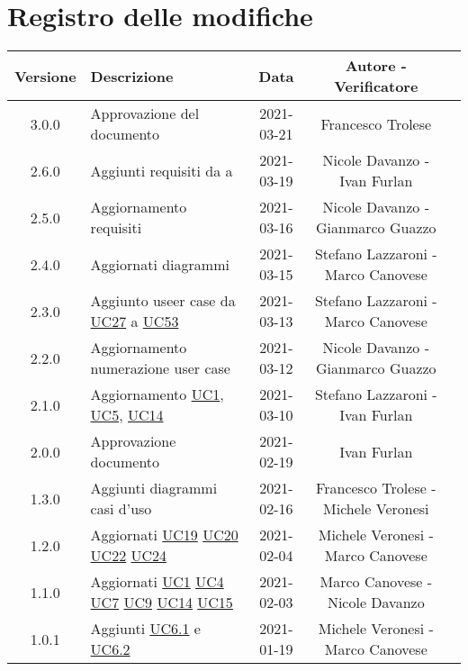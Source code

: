 \section*{Registro delle modifiche}

\begin{center}
	\begin{longtable}{|c|p{5cm}|c|c|c|}
	\hline
	\rowcolor{lighter-grayer}
	\textbf{Versione} & \textbf{Descrizione} & \textbf{Data} & \textbf{Autore - Verificatore} \\
	\hline
	\endfirsthead


	\hline
	3.0.0 & Approvazione del documento & 2021-03-21 & Francesco Trolese \\
	2.6.0 & Aggiunti requisiti da {F}{29} a {F}{43} & 2021-03-19 & Nicole Davanzo - Ivan Furlan\\
	2.5.0 & Aggiornamento requisiti & 2021-03-16 & Nicole Davanzo - Gianmarco Guazzo\\
	2.4.0 & Aggiornati diagrammi & 2021-03-15 & Stefano Lazzaroni - Marco Canovese\\
	2.3.0 & Aggiunto useer case da \hyperref[UC27]{UC27} a \hyperref[UC53]{UC53} & 2021-03-13 &  Stefano Lazzaroni - Marco Canovese\\
	2.2.0 & Aggiornamento numerazione user case & 2021-03-12 & Nicole Davanzo - Gianmarco Guazzo\\
	2.1.0 & Aggiornamento \hyperref[UC1]{UC1}, \hyperref[UC5]{UC5}, \hyperref[UC14]{UC14} & 2021-03-10 & Stefano Lazzaroni - Ivan Furlan \\
	2.0.0 & Approvazione documento & 2021-02-19 & Ivan Furlan\\
	1.3.0 & Aggiunti diagrammi casi d'uso & 2021-02-16 & Francesco Trolese - Michele Veronesi \\
	1.2.0 & Aggiornati \hyperref[UC19]{UC19} \hyperref[UC20]{UC20} \hyperref[UC22]{UC22} \hyperref[UC24]{UC24} & 2021-02-04 & Michele Veronesi - Marco Canovese\\
	1.1.0 & Aggiornati \hyperref[UC1]{UC1} \hyperref[UC4]{UC4} \hyperref[UC7]{UC7} \hyperref[UC9]{UC9} \hyperref[UC14]{UC14} \hyperref[UC15]{UC15} & 2021-02-03 & Marco Canovese - Nicole Davanzo\\
	1.0.1 & Aggiunti \hyperref[UC6.1]{UC6.1} e \hyperref[UC6.2]{UC6.2} & 2021-01-19 & Michele Veronesi - Marco Canovese\\

\end{longtable}
\end{center}
